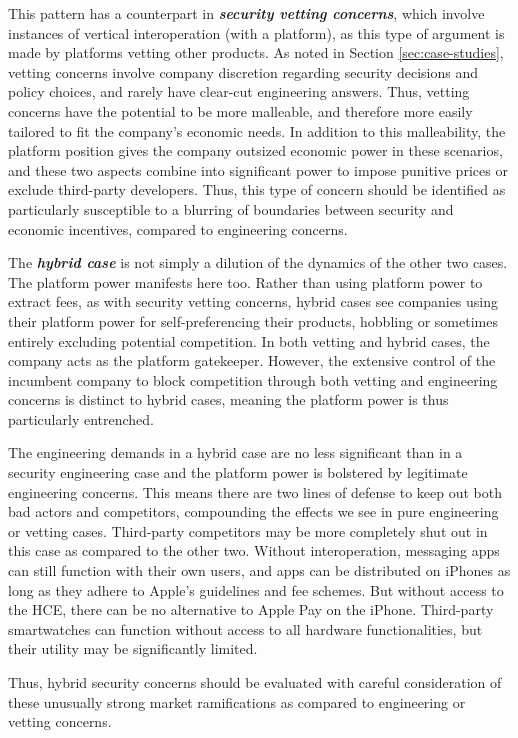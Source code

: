 \documentclass[letterpaper,twocolumn,10pt]{article}
\newcommand{\bi}[1]{\textbf{\textit{#1}}}
\begin{document}
This pattern has a counterpart in \bi{security vetting concerns}, which involve instances of vertical interoperation (with a platform), as this type of argument is made by platforms vetting other products. As noted in Section \ref{sec:case-studies}, vetting concerns involve company discretion regarding security decisions and policy choices, and rarely have clear-cut engineering answers. Thus, vetting concerns have the potential to be more malleable, and therefore more easily tailored to fit the company's economic needs. In addition to this malleability, the platform position gives the company outsized economic power in these scenarios, and these two aspects combine into significant power to impose punitive prices or exclude third-party developers.  Thus, this type of concern should be identified as particularly susceptible to a blurring of boundaries between security and economic incentives, compared to  engineering concerns.  

The \bi{hybrid case} is not simply a dilution of the dynamics of the other two cases.  The platform power manifests here too.  Rather than using platform power to extract fees, as with security vetting concerns, hybrid cases see companies using their platform power for self-preferencing their products, hobbling or sometimes entirely excluding potential competition.  In both vetting and hybrid cases, the company acts as the platform gatekeeper. However, the extensive control of the incumbent company to block competition through both vetting and engineering concerns is distinct to hybrid cases, meaning the platform power is thus particularly entrenched. 

The engineering demands in a hybrid case are no less significant than in a security engineering case and the platform power is bolstered by legitimate engineering concerns. This means there are two lines of defense to keep out both bad actors and competitors, compounding the effects we see in pure engineering or vetting cases.   Third-party competitors may be more completely shut out in this case as compared to the other two. Without interoperation, messaging apps can still function with their own users, and apps can be distributed on iPhones as long as they adhere to Apple's guidelines and fee schemes. But without access to the HCE, there can be no alternative to Apple Pay on the iPhone. Third-party smartwatches can function without access to all hardware functionalities, but their utility may be significantly limited. 

Thus, hybrid security concerns should be evaluated with careful consideration of these unusually strong market ramifications as compared to engineering or vetting concerns.
\end{document}
